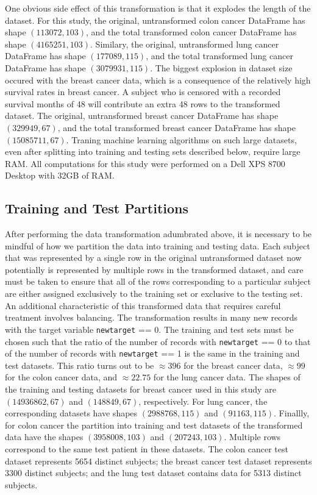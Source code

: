 \documentclass[10pt,letterpaper]{article}
\newcommand{\codewhite}[1]{\colorbox{white}{\texttt{#1}}}
\begin{document}
One obvious side effect of this transformation is that it explodes the length of the dataset.
For this study, the original, untransformed colon cancer DataFrame has shape $(113072, 103)$, and the total transformed colon cancer DataFrame has shape $(4165251, 103)$.
Similary, the original, untransformed lung cancer DataFrame has shape $(177089, 115)$, and the total transformed lung cancer DataFrame has shape $(3079931, 115)$.
The biggest explosion in dataset size occured with the breast cancer data, which is a consequence of the relatively high survival rates in breast cancer. A subject who is censored with a recorded survival months of 48 will contribute an extra 48 rows to the transformed dataset.  
The original, untransformed breast cancer DataFrame has shape $(329949, 67)$, and the total transformed breast cancer DataFrame has shape $(15085711, 67)$.
Traning machine learning algorithms on such large datasets, even after splitting into training and testing sets described below, require large RAM. All computations for this study were performed on a Dell XPS 8700 Desktop with 32GB of RAM.

\subsection*{Training and Test Partitions}
\label{subsec:traintest}


After performing the data transformation adumbrated above, it is necessary to be mindful of how we partition the data into training and testing data. Each subject that was represented by a single row in the original untransformed dataset now potentially is represented by multiple rows in the transformed dataset, and care must be taken to ensure that all of the rows corresponding to a particular subject are either assigned exclusively to the training set or exclusive to the testing set. 
An additional characteristic of this transformed data that requires careful treatment involves balancing. The transformation results in many new records with the target variable \codewhite{newtarget} == 0. The training and test sets must be chosen such that the ratio of the number of records with \codewhite{newtarget} == 0 to that of the number of records with \codewhite{newtarget} == 1 is the same in the training and test datasets.
This ratio turns out to be $\approx 396$ for the breast cancer data, $\approx  99$ for the colon cancer data, and 
$\approx 22.75$ for the lung cancer data. 
The shapes of the training and testing datasets for breast cancer used in this study are $(14936862, 67)$ and 
$(148849, 67)$, respectively.
For lung cancer, the corresponding datasets have shapes $(2988768, 115)$ and $(91163, 115)$.
Finallly, for colon cancer the partition into training and test datasets of the transformed data have the shapes 
$(3958008, 103)$ and $(207243, 103)$. Multiple rows correspond to the same test patient in these datasets.
The colon cancer test dataset represents 5654 distinct subjects; the breast cancer test dataset represents 3300 distinct subjects; and the lung test dataset contains data for 5313 distinct subjects.
\end{document}
